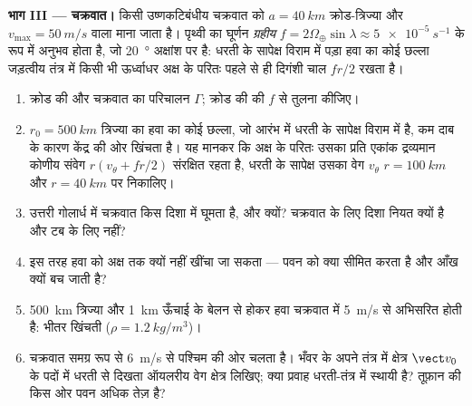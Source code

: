 \begin{problem}
\medskip
\noindent\textbf{भाग III --- चक्रवात।}
किसी उष्णकटिबंधीय चक्रवात को $a = \qty{40}{km}$ क्रोड-त्रिज्या और
$v_{\max} = \qty{50}{m/s}$ वाला  माना जाता है। पृथ्वी का घूर्णन
\emph{ग्रहीय } $f = 2\Omega_\oplus\sin\lambda
\approx \qty{5e-5}{s^{-1}}$ के रूप में अनुभव होता है, जो \qty{20}{\degree} अक्षांश पर है: धरती के सापेक्ष
विराम में पड़ा हवा का कोई छल्ला जड़त्वीय तंत्र में किसी भी ऊर्ध्वाधर अक्ष के
परितः पहले से ही दिगंशी चाल $fr/2$ रखता है।
\begin{enumerate}[resume]
  \item क्रोड की  और चक्रवात का परिचालन $\Gamma$;
        क्रोड की  की $f$ से तुलना कीजिए।
  \item $r_0 = \qty{500}{km}$ त्रिज्या का हवा का कोई छल्ला, जो आरंभ में
        धरती के सापेक्ष विराम में है, कम दाब के कारण केंद्र की ओर खिंचता
        है। यह मानकर कि अक्ष के परितः उसका प्रति एकांक द्रव्यमान कोणीय
        संवेग $r(v_\theta + fr/2)$ संरक्षित रहता है, धरती के सापेक्ष उसका
        वेग $v_\theta$ $r = \qty{100}{km}$ और $r = \qty{40}{km}$ पर
        निकालिए।
  \item उत्तरी गोलार्ध में चक्रवात किस दिशा में घूमता है, और
        क्यों? चक्रवात के लिए दिशा नियत क्यों है और टब के लिए
        नहीं?
  \item इस तरह हवा को अक्ष तक क्यों नहीं खींचा जा सकता ---
        पवन को क्या सीमित करता है और आँख क्यों बच जाती है?
  \item \qty{500}{km} त्रिज्या और \qty{1}{km} ऊँचाई के बेलन से होकर हवा
        चक्रवात में \qty{5}{m/s} से अभिसरित होती है: भीतर खिंचती
         ($\rho = \qty{1.2}{kg/m^3}$)।
  \item चक्रवात समग्र रूप से \qty{6}{m/s} से पश्चिम की ओर चलता है।
        भँवर के अपने तंत्र में क्षेत्र $\vect v_0$ के पदों में
        धरती से दिखता ऑयलरीय वेग क्षेत्र लिखिए; क्या प्रवाह
        धरती-तंत्र में स्थायी है? तूफ़ान की किस ओर पवन
        अधिक तेज़ है?
\end{enumerate}


\end{problem}
